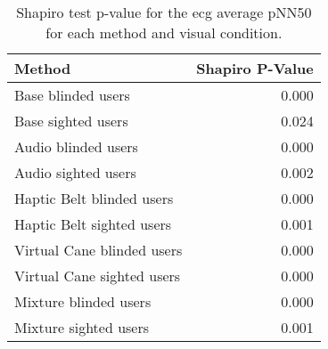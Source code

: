 
\begin{table}[!htb]
\centering
\caption{Shapiro test p-value for the ecg average pNN50 for each method and visual condition.}
\label{tab:shapiro_ecg_pnn50}
\begin{tabular}{lr}
\toprule
                    Method &  Shapiro P-Value \\
\midrule
        Base blinded users &            0.000 \\
        Base sighted users &            0.024 \\
       Audio blinded users &            0.000 \\
       Audio sighted users &            0.002 \\
 Haptic Belt blinded users &            0.000 \\
 Haptic Belt sighted users &            0.001 \\
Virtual Cane blinded users &            0.000 \\
Virtual Cane sighted users &            0.000 \\
     Mixture blinded users &            0.000 \\
     Mixture sighted users &            0.001 \\
\bottomrule
\end{tabular}
\end{table}

